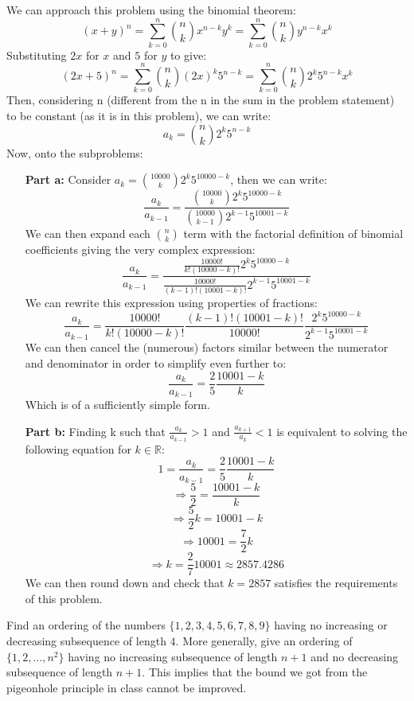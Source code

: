 \documentclass[11pt]{amsart}
\begin{document}
\begin{solution}

We can approach this problem using the binomial theorem:
$$(x+y)^n = \sum_{k=0}^n \binom{n}{k} x^{n-k} y^k = \sum_{k=0}^n \binom{n}{k} y^{n-k} x^k$$
Substituting $2x$ for $x$ and $5$ for $y$ to give:
$$(2x+5)^n = \sum_{k=0}^n \binom{n}{k} (2x)^k 5^{n-k} = \sum_{k=0}^n \binom{n}{k} 2^k 5^{n-k} x^k$$
Then, considering n (different from the n in the sum in the problem statement) to be constant (as it is in this problem), we can write:
$$a_k = \binom{n}{k} 2^k 5^{n-k}$$
Now, onto the subproblems:

\begin{itemize}
	\item[\textbf{Part a:}]{}
		Consider $a_k = \binom{10000}{k} 2^k 5^{10000-k}$, then we can write:
		$$\frac{a_k}{a_{k-1}} = \frac{\binom{10000}{k} 2^k 5^{10000-k}}{\binom{10000}{k-1} 2^{k-1} 5^{10001-k}}$$
		We can then expand each $\binom{n}{k}$ term with the factorial definition of binomial coefficients giving the very complex expression:
		$$\frac{a_k}{a_{k-1}} = \frac{\frac{10000!}{k!(10000-k)!} 2^k 5^{10000-k}}{\frac{10000!}{(k-1)!(10001-k)!} 2^{k-1} 5^{10001-k}}$$
		We can rewrite this expression using properties of fractions:
		$$\frac{a_k}{a_{k-1}} = \frac{10000!}{k!(10000-k)!} \frac{(k-1)!(10001-k)!}{10000!} \frac{2^k 5^{10000-k}}{2^{k-1} 5^{10001-k}}$$
		We can then cancel the (numerous) factors similar between the numerator and denominator in order to simplify even further to:
		$$\frac{a_k}{a_{k-1}} = \frac{2}{5}\frac{10001-k}{k}$$
		Which is of a sufficiently simple form.
		\vskip 0.15in
	\item[\textbf{Part b:}]{} Finding k such that $\frac{a_k}{a_{k-1}} > 1$ and $\frac{a_{k+1}}{a_k} < 1$ is equivalent to solving the following equation for $k \in \mathbb{R}$:
		$$1 = \frac{a_k}{a_{k-1}} = \frac{2}{5} \frac{10001-k}{k}$$
		$$\Rightarrow \frac{5}{2} = \frac{10001-k}{k}$$
		$$\Rightarrow \frac{5}{2} k = 10001-k$$
		$$\Rightarrow 10001 = \frac{7}{2}k$$
		$$\Rightarrow k = \frac{2}{7} 10001 \approx	2857.4286$$
		We can then round down and check that $k = 2857$ satisfies the requirements of this problem.
\end{itemize}
\end{solution}
 
 
\begin{problem}

Find an ordering of the numbers $\{1,2,3,4,5,6,7,8,9\}$ having no increasing or decreasing subsequence of length $4$.  More generally, give an ordering of $\{1,2,\dots,n^2\}$ having no increasing subsequence of length $n+1$ and no decreasing subsequence of length $n+1$.  This implies that the bound we got from the pigeonhole principle in class cannot be improved.
\end{problem}
\begin{solution}
\end{solution}
\end{document}
